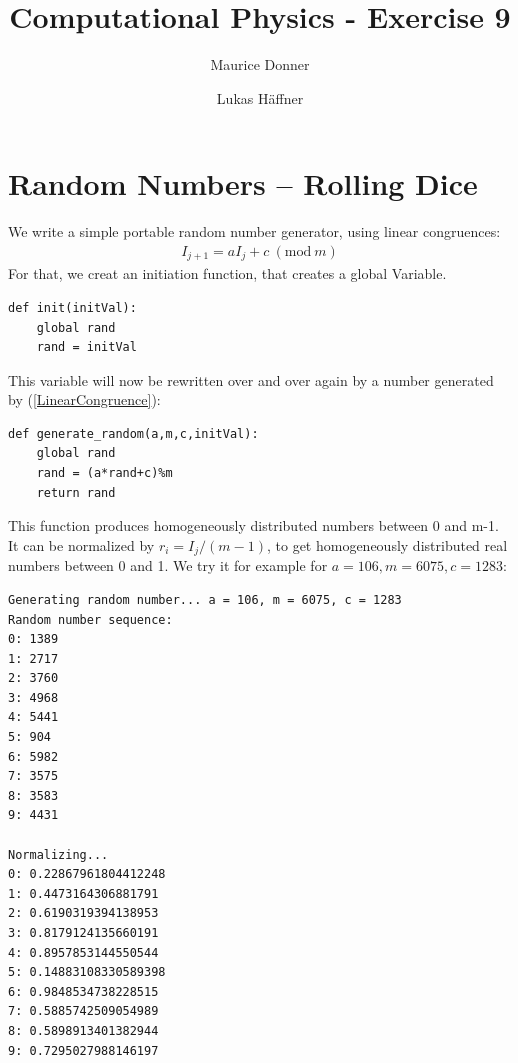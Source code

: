 \documentclass{article}
\title{Computational Physics - Exercise 9}
\author{Maurice Donner \and Lukas Häffner}
\begin{document}
\maketitle
\newpage

\section{Random Numbers -- Rolling Dice}

We write a simple portable random number generator, using linear congruences:
\begin{align}
    I _{j+1} = a I _{j} + c \ ( \text{mod} \ m )
    \label{LinearCongruence}
\end{align}
For that, we creat an initiation function, that creates a global Variable.

\begin{lstlisting}
def init(initVal):
    global rand
    rand = initVal
\end{lstlisting}

This variable will now be rewritten over and over again by a number generated
by (\ref{LinearCongruence}):

\begin{lstlisting}
def generate_random(a,m,c,initVal):
    global rand
    rand = (a*rand+c)%m
    return rand
\end{lstlisting}

This function produces homogeneously distributed numbers between 0 and m-1.
It can be normalized by \( r_i = I_j /(m-1) \), to get homogeneously distributed
real numbers between 0 and 1. We try it for example for \( a = 106, m = 6075,
c = 1283\):
\begin{lstlisting}
Generating random number... a = 106, m = 6075, c = 1283
Random number sequence:
0: 1389
1: 2717
2: 3760
3: 4968
4: 5441
5: 904
6: 5982
7: 3575
8: 3583
9: 4431

Normalizing...
0: 0.22867961804412248
1: 0.4473164306881791
2: 0.6190319394138953
3: 0.8179124135660191
4: 0.8957853144550544
5: 0.14883108330589398
6: 0.9848534738228515
7: 0.5885742509054989
8: 0.5898913401382944
9: 0.7295027988146197
\end{lstlisting}
\end{document}
